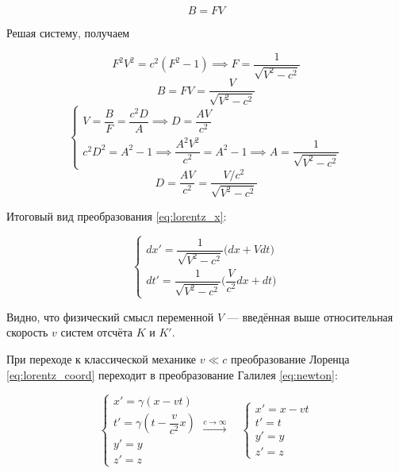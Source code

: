 \documentclass{article}
\begin{document}
\begin{equation*}
    B=FV
\end{equation*}

Решая систему, получаем

\begin{equation*}
    F^2V^2=c^2\left(F^2-1\right) \implies F=\frac{1}{\sqrt{V^2-c^2}}
\end{equation*}
\begin{equation*}
    B=FV=\frac{V}{\sqrt{V^2-c^2}}
\end{equation*}
\begin{equation*}
    \begin{cases}
    V=\dfrac{B}{F}=\dfrac{c^2D}{A} \implies D=\dfrac{AV}{c^2}\\
    c^2D^2=A^2-1 \implies \dfrac{A^2V^2}{c^2}=A^2-1 \implies A=\dfrac{1}{\sqrt{V^2-c^2}}
    \end{cases}
\end{equation*}
\begin{equation*}
    D=\frac{AV}{c^2}=\frac{V/c^2}{\sqrt{V^2-c^2}}
\end{equation*}

Итоговый вид преобразования \eqref{eq:lorentz_x}:

\begin{equation*}
    \begin{cases}
    dx'=\dfrac{1}{\sqrt{V^2-c^2}}\big(dx+Vdt\big)\\
    dt'=\dfrac{1}{\sqrt{V^2-c^2}}\big(\dfrac{V}{c^2}dx+dt\big)
    \end{cases}
\end{equation*}

Видно, что физический смысл переменной $V$ --- введённая выше относительная скорость $v$ систем отсчёта $K$ и $K'$.

При переходе к классической механике $v\ll c$ преобразование Лоренца \eqref{eq:lorentz_coord} переходит в преобразование Галилея \eqref{eq:newton}:

\begin{equation*}
    \begin{cases}
    x'=\gamma\left(x-vt\right)\\
    t'=\gamma\left(t-\dfrac{v}{c^2}x\right)\\
    y'=y\\
    z'=z
    \end{cases}
    \xrightarrow{c\to\infty}\quad
    \begin{cases}
    x'=x-vt\\
    t'=t\\
    y'=y\\
    z'=z
    \end{cases}
\end{equation*}
\end{document}

